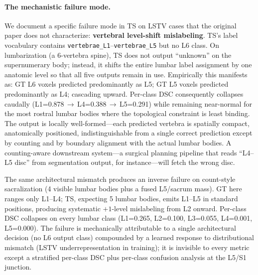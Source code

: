 \documentclass{article}
\begin{document}
\paragraph{The mechanistic failure mode.}
We document a specific failure mode in TS on LSTV cases that the
original paper does not characterize:
\textbf{vertebral level-shift mislabeling}.
TS's label vocabulary contains
\texttt{vertebrae\_L1}--\texttt{vertebrae\_L5} but no L6 class.
On lumbarization (a 6-vertebra spine), TS does not output
``unknown'' on the supernumerary body; instead, it shifts the
entire lumbar label assignment by one anatomic level so that all
five outputs remain in use.
Empirically this manifests as: GT L6 voxels predicted predominantly
as L5; GT L5 voxels predicted predominantly as L4; cascading
upward.
Per-class DSC consequently collapses caudally
(L1=0.878\,$\to$\,L4=0.388\,$\to$\,L5=0.291)
while remaining near-normal for the most rostral lumbar bodies
where the topological constraint is least binding.
The output is locally well-formed---each predicted vertebra is
spatially compact, anatomically positioned, indistinguishable
from a single correct prediction except by counting and by
boundary alignment with the actual lumbar bodies.
A counting-aware downstream system---a surgical planning pipeline
that reads ``L4--L5 disc'' from segmentation output, for
instance---will fetch the wrong disc.

The same architectural mismatch produces an inverse failure on
count-style sacralization (4 visible lumbar bodies plus a fused
L5/sacrum mass).
GT here ranges only L1--L4; TS, expecting 5 lumbar bodies,
emits L1--L5 in standard positions, producing systematic
$+1$-level mislabeling from L2 onward.
Per-class DSC collapses on every lumbar class
(L1=0.265, L2=0.100, L3=0.055, L4=0.001, L5=0.000).
The failure is mechanically attributable to a single architectural
decision (no L6 output class) compounded by a learned response to
distributional mismatch (LSTV underrepresentation in training);
it is invisible to every metric except a stratified per-class DSC
plus per-class confusion analysis at the L5/S1 junction.
\end{document}
